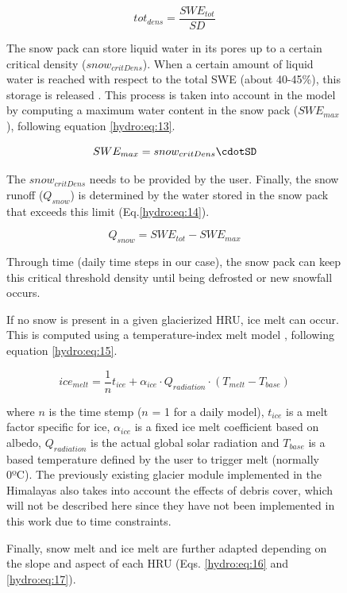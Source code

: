 \begin{figure}[h]
\begin{equation} \label{hydro:eq:12}
tot_{dens} = \frac{SWE_{tot}}{SD}
\end{equation} 

The snow pack can store liquid water in its pores up to a certain critical density ($snow_{critDens}$). When a certain amount of liquid water is reached with respect to the total SWE (about 40-45\%), this storage is released \citep{bertle_effect_1966}. This process is taken into account in the model by computing a maximum water content in the snow pack ($SWE_{max}$), following equation \ref{hydro:eq:13}.

\begin{equation} \label{hydro:eq:13}
SWE_{max} = snow_{critDens}\cdotSD
\end{equation} 

The $snow_{critDens}$ needs to be provided by the user. Finally, the snow runoff ($Q_{snow}$) is determined by the water stored in the snow pack that exceeds this limit (Eq.\ref{hydro:eq:14}).

\begin{equation} \label{hydro:eq:14}
Q_{snow} = SWE_{tot} - SWE_{max}
\end{equation} 

Through time (daily time steps in our case), the snow pack can keep this critical threshold density until being defrosted or new snowfall occurs. 

If no snow is present in a given glacierized HRU, ice melt can occur. This is computed using a temperature-index melt model \citep{hock_temperature_2003}, following equation \ref{hydro:eq:15}.

\begin{equation} \label{hydro:eq:15}
ice_{melt} = \frac{1}{n}t_{ice} + \alpha_{ice } \cdot Q_{radiation} \cdot(T_{melt} - T_{base})
\end{equation} 

where $n$ is the time stemp ($n$ = 1 for a daily model), $t_{ice}$ is a melt factor specific for ice, $\alpha_{ice}$ is a fixed ice melt coefficient based on albedo, $Q_{radiation}$ is the actual global solar radiation and $T_{base}$ is a based temperature defined by the user to trigger melt (normally 0ºC). The previously existing glacier module implemented in the Himalayas also takes into account the effects of debris cover, which will not be described here since they have not been implemented in this work due to time constraints. 

Finally, snow melt and ice melt are further adapted depending on the slope and aspect of each HRU (Eqs. \ref{hydro:eq:16} and \ref{hydro:eq:17}).


\end{figure}
